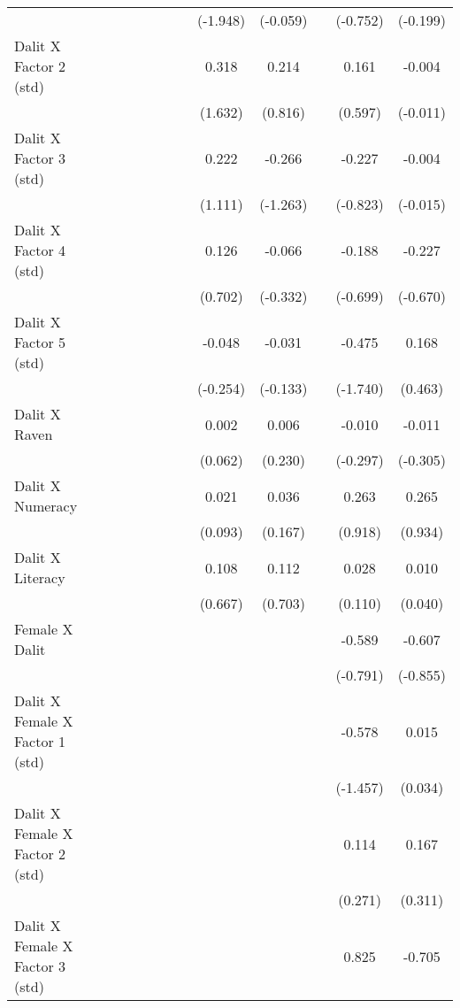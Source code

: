 {\begin{longtable}{@{\extracolsep{\fill}}lccccccccccc}
      &   &   &   &   &   &   & (-1.948) & (-0.059) &   & (-0.752) & (-0.199) \\
    Dalit X Factor 2 (std) &   &   &   &   &   &   & 0.318 & 0.214 &   & 0.161 & -0.004 \\
      &   &   &   &   &   &   & (1.632) & (0.816) &   & (0.597) & (-0.011) \\
    Dalit X Factor 3 (std) &   &   &   &   &   &   & 0.222 & -0.266 &   & -0.227 & -0.004 \\
      &   &   &   &   &   &   & (1.111) & (-1.263) &   & (-0.823) & (-0.015) \\
    Dalit X Factor 4 (std) &   &   &   &   &   &   & 0.126 & -0.066 &   & -0.188 & -0.227 \\
      &   &   &   &   &   &   & (0.702) & (-0.332) &   & (-0.699) & (-0.670) \\
    Dalit X Factor 5 (std) &   &   &   &   &   &   & -0.048 & -0.031 &   & -0.475 & 0.168 \\
      &   &   &   &   &   &   & (-0.254) & (-0.133) &   & (-1.740) & (0.463) \\
    Dalit X Raven &   &   &   &   &   &   & 0.002 & 0.006 &   & -0.010 & -0.011 \\
      &   &   &   &   &   &   & (0.062) & (0.230) &   & (-0.297) & (-0.305) \\
    Dalit X Numeracy &   &   &   &   &   &   & 0.021 & 0.036 &   & 0.263 & 0.265 \\
      &   &   &   &   &   &   & (0.093) & (0.167) &   & (0.918) & (0.934) \\
    Dalit X Literacy &   &   &   &   &   &   & 0.108 & 0.112 &   & 0.028 & 0.010 \\
      &   &   &   &   &   &   & (0.667) & (0.703) &   & (0.110) & (0.040) \\
    Female X Dalit &   &   &   &   &   &   &   &   &   & -0.589 & -0.607 \\
      &   &   &   &   &   &   &   &   &   & (-0.791) & (-0.855) \\
    Dalit X Female X Factor 1 (std) &   &   &   &   &   &   &   &   &   & -0.578 & 0.015 \\
      &   &   &   &   &   &   &   &   &   & (-1.457) & (0.034) \\
    Dalit X Female X Factor 2 (std) &   &   &   &   &   &   &   &   &   & 0.114 & 0.167 \\
      &   &   &   &   &   &   &   &   &   & (0.271) & (0.311) \\
    Dalit X Female X Factor 3 (std) &   &   &   &   &   &   &   &   &   & 0.825 & -0.705 \\

\end{longtable}}
